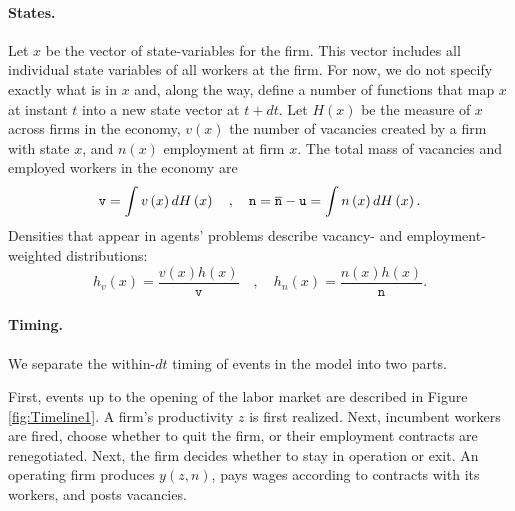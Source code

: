 \vspace*{-.3cm}
\paragraph{States.}
Let $x$ be the vector of state-variables for the firm.
This vector includes all individual state variables of all workers at the firm.
For now, we do not specify exactly what is in $x$ and, along the way, define a number of functions that map $x$ at instant $t$ into a new state vector at $t+dt$.
Let $H\left(x\right)$ be the measure of $x$ across firms in the economy, $v(x)$ the number of vacancies created by a firm with state $x$, and $n(x)$ employment at firm $x$.
The total mass of vacancies and employed workers in the economy are
\vspace*{-.2cm}\begin{equation*}
\mathtt{v}= \int v\left( x\right) dH\left( x\right) \quad ,\quad
\mathtt{n}=\overline{\mathtt{n}}-\mathtt{u}= \int n\left( x\right) dH\left( x\right) .
\vspace*{-.2cm}\end{equation*}%
Densities that appear in agents' problems describe vacancy- and employment-weighted distributions:
\vspace*{-.2cm}\begin{equation*}
h_v\left( x\right) =\frac{v(x)h(x)}{\mathtt{v}}\quad ,\quad h_n\left(x\right) =\frac{n(x)h(x)}{\mathtt{n}}.
\end{equation*}

\vspace*{-.3cm}
\paragraph{Timing.}
We separate the within-$dt$ timing of events in the model into two parts.

First, events up to the opening of the labor market are described in Figure \ref{fig:Timeline1}.
A firm's productivity $z$ is first realized.
Next, incumbent workers are fired, choose whether to quit the firm, or their employment contracts are renegotiated.
Next, the firm decides whether to stay in operation or exit.
An operating firm produces $y(z,n)$, pays wages according to contracts with its workers, and posts vacancies.

